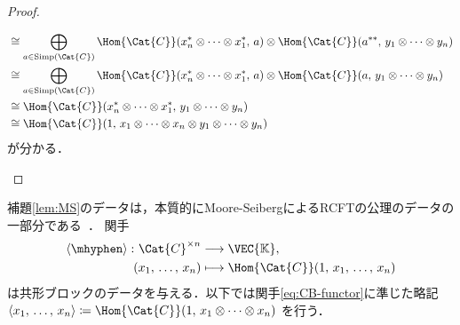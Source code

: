 \documentclass[TQFT_main]{subfiles}
\begin{document}
\begin{proof}
\begin{enumerate}
\begin{align}
            &\cong \bigoplus_{a \in \mathrm{Simp}(\Cat{C})} \Hom{\Cat{C}} (x_n^* \otimes \cdots \otimes x_1^*,\, a) \otimes  \Hom{\Cat{C}}(a^{**},\, y_1 \otimes \cdots \otimes y_n) \\
            &\cong \bigoplus_{a \in \mathrm{Simp}(\Cat{C})} \Hom{\Cat{C}} (x_n^* \otimes \cdots \otimes x_1^*,\, a) \otimes  \Hom{\Cat{C}}(a,\, y_1 \otimes \cdots \otimes y_n) \\
            &\cong \Hom{\Cat{C}} (x_n^* \otimes \cdots \otimes x_1^*,\, y_1 \otimes \cdots \otimes y_n) \\
            &\cong \Hom{\Cat{C}} (1,\, x_1\otimes \cdots \otimes x_{n} \otimes y_1 \otimes \cdots \otimes y_n)
        \end{align}
        が分かる．
    \end{enumerate}
    
\end{proof}

\begin{marker}
    補題\ref{lem:MS}のデータは，本質的にMoore-SeibergによるRCFTの公理のデータの一部分である~\cite[THEOREM5.3.8., p.111]{Bakalov2001lectures}．
    関手
    \begin{align}
        \label{eq:CB-functor}
        \expval{\mhyphen} \colon \Cat{C}^{\times n} &\lto \VEC{\mathbb{K}},\\ 
        (x_1,\, \dots,\, x_n) &\lmto \Hom{\Cat{C}}(1,\, x_1,\, \dots,\, x_n)
    \end{align}
    は共形ブロックのデータを与える．以下では関手\eqref{eq:CB-functor}に準じた略記 $\expval{x_1,\, \dots,\, x_n} \coloneqq \Hom{\Cat{C}} (1,\, x_1 \otimes \cdots \otimes x_n)$ を行う．
\end{marker}
\end{document}
